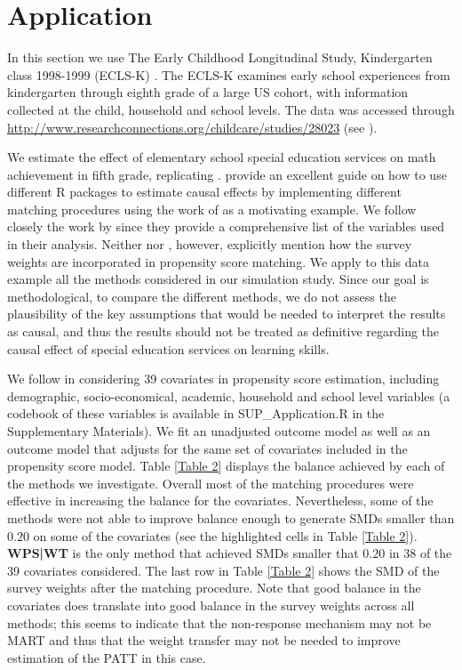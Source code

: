 \documentclass[oupdraft]{bio}
\begin{document}
\section{Application}
\label{S4}

In this section we use The Early Childhood Longitudinal Study, Kindergarten class 1998-1999 (ECLS-K) \citep{tourangeau2009early}. The ECLS-K examines early school experiences from kindergarten through eighth grade of a large US cohort, with information collected at the child, household and school levels. The data was accessed through   \url{http://www.researchconnections.org/childcare/studies/28023} (see \citet{ECLS}).

We estimate the effect of elementary school special education services on math achievement in fifth grade, replicating \citet{keller2016propensity}.
\citeauthor{keller2016propensity} provide an excellent guide on how to use different R packages to estimate causal effects by implementing different matching procedures using the work of \citet{morgan2008propensity} as a motivating example. We follow closely the work by \citeauthor{keller2016propensity} since they provide a comprehensive list of the variables used in their analysis. Neither \citeauthor{morgan2008propensity} nor \citeauthor{keller2016propensity}, however, explicitly mention how the survey weights are incorporated in propensity score matching. We apply to this data example all the methods considered in our simulation study.
Since our goal is methodological, to compare the different methods, we do not assess the plausibility of the key assumptions that would be needed to interpret the results as causal, and thus the results should not be treated as definitive regarding the causal effect of special education services on learning skills. 

We follow \citet{keller2016propensity} in considering 39 covariates in propensity score estimation, including demographic, socio-economical, academic, household and school level variables (a codebook of these variables is available in SUP\_Application.R in the Supplementary Materials). We fit an unadjusted outcome model as well as an outcome model that adjusts for the same set of covariates included in the propensity score model. Table \ref{Table 2} displays the balance achieved by each of the methods we investigate. Overall most of the matching procedures were effective in increasing the balance for the covariates. Nevertheless, some of the methods were not able to improve balance enough to generate SMDs smaller than $0.20$ on some of the covariates (see the highlighted cells in Table \ref{Table 2}). \textbf{WPS|WT} is the only method that achieved SMDs smaller that $0.20$ in 38 of the 39 covariates considered. The last row in Table \ref{Table 2} shows the SMD of the survey weights after the matching procedure. Note that good balance in the covariates does translate into good balance in the survey weights across all methods; this seems to indicate that the non-response mechanism may not be MART and thus that the weight transfer may not be needed to improve estimation of the PATT in this case.
\end{document}
